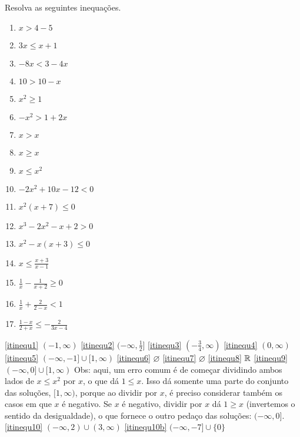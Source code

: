 \begin{exo}
Resolva as seguintes inequações.
\begin{multicols}{3}
\begin{enumerate}
 \item\label{itinequ1} $x>4-5$
 \item\label{itinequ2} $3x\leq x+1$
 \item\label{itinequ3} $-8x<3-4x$
 \item\label{itinequ4} $10>10-x$
 \item\label{itinequ5} $x^2\geq 1$
 \item\label{itinequ6} $-x^2>1+2x$
 \item\label{itinequ7} $x>x$
 \item\label{itinequ8} $x\geq x$
 \item\label{itinequ9} $x\leq x^2$
\item\label{itinequ10} $-2x^2+10x-12<0$
\item\label{itinequ10b} $x^2(x+7)\leq 0$
\item\label{itinequ11} $x^3-2x^2-x+2>0$
\item\label{itinequ12} $x^2-x(x+3)\leq 0$
\item\label{itinequ13} $x\leq \frac{x+3}{x-1}$
\item\label{itt6} $\frac{1}{x}-\frac{1}{x+2}\geq 0$
\item\label{itt7} $\frac{1}{x}+\frac{2}{2-x}<1$
\item\label{itt7a} $\frac{1-x}{2+x}\leq -\frac{2}{3x-4}$
\end{enumerate}
\end{multicols}
\vspace{0.01cm}
\begin{sol}
 \eqref{itinequ1} $(-1,\infty)$
 \eqref{itinequ2} $(-\infty,\tfrac12]$
 \eqref{itinequ3} $(-\tfrac34,\infty)$
 \eqref{itinequ4} $(0,\infty)$
 \eqref{itinequ5} $(-\infty,-1]\cup [1,\infty)$
 \eqref{itinequ6} $\varnothing$
 \eqref{itinequ7} $\varnothing$
 \eqref{itinequ8} $\mathbb{R}$
 \eqref{itinequ9} $(-\infty,0]\cup [1,\infty)$ Obs: aqui, um erro comum é de começar
dividindo ambos lados de $x\leq x^2$ por $x$, o que dá $1\leq x$. Isso dá somente uma
parte do conjunto das soluções, $[1,\infty)$, porque ao dividir por $x$, é preciso
considerar também os casos em que $x$ é negativo. Se $x$ é negativo, dividir por $x$ dá
$1\geq x$ (invertemos o sentido da desigualdade), o que fornece o outro pedaço das
soluções: $(-\infty,0]$.
 \eqref{itinequ10} $(-\infty,2)\cup (3,\infty)$
\eqref{itinequ10b} $(-\infty,-7]\cup \{0\}$

\end{sol}
\end{exo}
